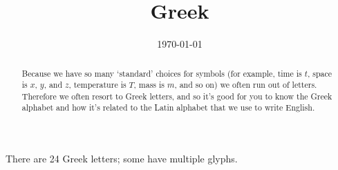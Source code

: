 
\providecommand{\repositoryInformationSetup}{} %
\repositoryInformationSetup





\title{Greek}
\contact
\date{\today}

\begin{abstract}
	Because we have so many `standard' choices for symbols (for example, time is $t$, space is $x$, $y$, and $z$, temperature is $T$, mass is $m$, and so on) we often run out of letters.
	Therefore we often resort to Greek letters, and so it's good for you to know the Greek alphabet and how it's related to the Latin alphabet that we use to write English.
\end{abstract}

\maketitle

There are 24 Greek letters; some have multiple glyphs.

